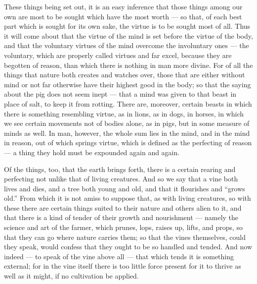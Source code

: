  These things being set out, it is an easy inference that those things among our own are most to be sought which have the most worth — so that, of each best part which is sought for its own sake, the virtue is to be sought most of all. Thus it will come about that the virtue of the mind is set before the virtue of the body, and that the voluntary virtues of the mind overcome the involuntary ones — the voluntary, which are properly called virtues and far excel, because they are begotten of reason, than which there is nothing in man more divine. For of all the things that nature both creates and watches over, those that are either without mind or not far otherwise have their highest good in the body; so that the saying about the pig does not seem inept — that a mind was given to that beast in place of salt, to keep it from rotting. There are, moreover, certain beasts in which there is something resembling virtue, as in lions, as in dogs, in horses, in which we see certain movements not of bodies alone, as in pigs, but in some measure of minds as well. In man, however, the whole sum lies in the mind, and in the mind in reason, out of which springs virtue, which is defined as the perfecting of reason — a thing they hold must be expounded again and again.

 Of the things, too, that the earth brings forth, there is a certain rearing and perfecting not unlike that of living creatures. And so we say that a vine both lives and dies, and a tree both young and old, and that it flourishes and ``grows old.'' From which it is not amiss to suppose that, as with living creatures, so with these there are certain things suited to their nature and others alien to it, and that there is a kind of tender of their growth and nourishment — namely the science and art of the farmer, which prunes, lops, raises up, lifts, and props, so that they can go where nature carries them; so that the vines themselves, could they speak, would confess that they ought to be so handled and tended. And now indeed — to speak of the vine above all — that which tends it is something external; for in the vine itself there is too little force present for it to thrive as well as it might, if no cultivation be applied.

